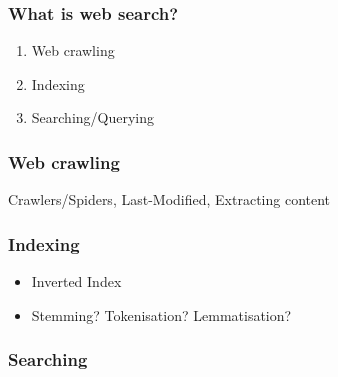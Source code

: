 \documentclass{beamer}
\begin{document}
\begin{frame}
  \frametitle{What is web search?}
  \begin{enumerate}
    \item Web crawling
    \item Indexing
    \item Searching/Querying
  \end{enumerate}
\end{frame}

\begin{frame}
  \frametitle{Web crawling}
  Crawlers/Spiders, Last-Modified, Extracting content
\end{frame}

\begin{frame}
  \frametitle{Indexing}
  \begin{itemize}
  \item Inverted Index
  \item Stemming? Tokenisation? Lemmatisation?
  \end{itemize}
\end{frame}

\begin{frame}
  \frametitle{Searching}
\end{frame}
\end{document}
